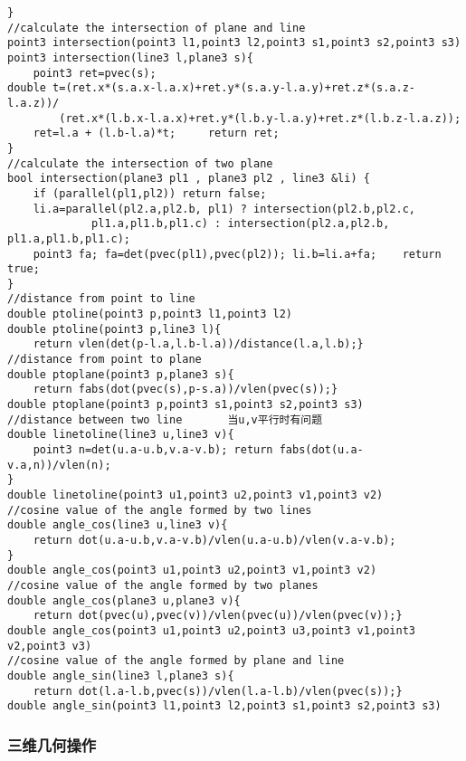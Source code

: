 \documentclass{article}
\begin{document}
\begin{lstlisting}
}
//calculate the intersection of plane and line
point3 intersection(point3 l1,point3 l2,point3 s1,point3 s2,point3 s3)
point3 intersection(line3 l,plane3 s){
    point3 ret=pvec(s);
double t=(ret.x*(s.a.x-l.a.x)+ret.y*(s.a.y-l.a.y)+ret.z*(s.a.z-l.a.z))/
        (ret.x*(l.b.x-l.a.x)+ret.y*(l.b.y-l.a.y)+ret.z*(l.b.z-l.a.z));
    ret=l.a + (l.b-l.a)*t;     return ret;
}
//calculate the intersection of two plane
bool intersection(plane3 pl1 , plane3 pl2 , line3 &li) {
    if (parallel(pl1,pl2)) return false;
    li.a=parallel(pl2.a,pl2.b, pl1) ? intersection(pl2.b,pl2.c,
             pl1.a,pl1.b,pl1.c) : intersection(pl2.a,pl2.b, pl1.a,pl1.b,pl1.c);
    point3 fa; fa=det(pvec(pl1),pvec(pl2)); li.b=li.a+fa;    return true;
}
//distance from point to line
double ptoline(point3 p,point3 l1,point3 l2)
double ptoline(point3 p,line3 l){
    return vlen(det(p-l.a,l.b-l.a))/distance(l.a,l.b);}
//distance from point to plane
double ptoplane(point3 p,plane3 s){
    return fabs(dot(pvec(s),p-s.a))/vlen(pvec(s));}
double ptoplane(point3 p,point3 s1,point3 s2,point3 s3)
//distance between two line       当u,v平行时有问题
double linetoline(line3 u,line3 v){
    point3 n=det(u.a-u.b,v.a-v.b); return fabs(dot(u.a-v.a,n))/vlen(n);
}
double linetoline(point3 u1,point3 u2,point3 v1,point3 v2)
//cosine value of the angle formed by two lines
double angle_cos(line3 u,line3 v){
    return dot(u.a-u.b,v.a-v.b)/vlen(u.a-u.b)/vlen(v.a-v.b);
}
double angle_cos(point3 u1,point3 u2,point3 v1,point3 v2)
//cosine value of the angle formed by two planes
double angle_cos(plane3 u,plane3 v){
    return dot(pvec(u),pvec(v))/vlen(pvec(u))/vlen(pvec(v));}
double angle_cos(point3 u1,point3 u2,point3 u3,point3 v1,point3 v2,point3 v3)
//cosine value of the angle formed by plane and line
double angle_sin(line3 l,plane3 s){
    return dot(l.a-l.b,pvec(s))/vlen(l.a-l.b)/vlen(pvec(s));}
double angle_sin(point3 l1,point3 l2,point3 s1,point3 s2,point3 s3)
\end{lstlisting}

\subsubsection{三维几何操作}
\end{document}
